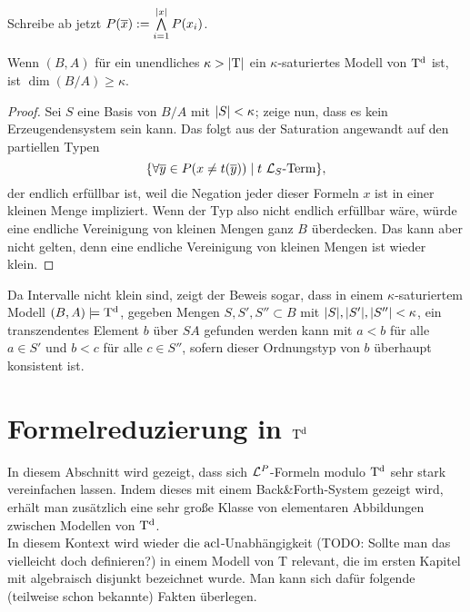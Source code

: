 \begin{definition}
	Schreibe ab jetzt $P(\overline{x}):=\bigwedge\limits_{i=1}^{\left| x \right|}P(x_i)$.
\end{definition}

\newpage

\begin{lemma}
	Wenn $(B,A)$ für ein unendliches $\kappa>{\left| \operatorname{T} \right|}$ ein $\kappa$-saturiertes Modell von $\operatorname{T^d}$ ist, ist $\dim(B/A)\geq\kappa$.
\end{lemma}
\begin{proof}
	Sei $S$ eine Basis von $B/A$ mit ${\left| S \right|}<\kappa$; zeige nun, dass es kein Erzeugendensystem sein kann. Das folgt aus der Saturation angewandt auf den partiellen Typen $$\{\forall\overline{y}\in P(x\neq t(\overline{y}))\mid t\ \mathcal{L}_S\text{-Term}\},$$ der endlich erfüllbar ist, weil die Negation jeder dieser Formeln \glqq{}$x$ ist in einer kleinen Menge\grqq{} impliziert. Wenn der Typ also nicht endlich erfüllbar wäre, würde eine endliche Vereinigung von kleinen Mengen ganz $B$ überdecken. Das kann aber nicht gelten, denn eine endliche Vereinigung von kleinen Mengen ist wieder klein.
\end{proof}

\begin{corollary}\label{Finden transz Elte}
	Da Intervalle nicht klein sind, zeigt der Beweis sogar, dass in einem $\kappa$-saturiertem Modell $(B,A)\models\operatorname{T^d}$, gegeben Mengen $S,S',S''\subset B$ mit ${\left| S \right|},{\left| S' \right|},{\left| S'' \right|}<\kappa$, ein transzendentes Element $b$ über $SA$ gefunden werden kann mit $a<b$ für alle $a\in S'$ und $b<c$ für alle $c\in S''$, sofern dieser Ordnungstyp von $b$ überhaupt konsistent ist.
\end{corollary}

\newpage

\section{Formelreduzierung in $\operatorname{T^d}$}
In diesem Abschnitt wird gezeigt, dass sich $\mathcal{L}^P$-Formeln modulo $\operatorname{T^d}$ sehr stark vereinfachen lassen. Indem dieses mit einem Back\&Forth-System gezeigt wird, erhält man zusätzlich eine sehr große Klasse von elementaren Abbildungen zwischen Modellen von $\operatorname{T^d}$.\\
In diesem Kontext wird wieder die $\operatorname{acl}$-Unabhängigkeit (TODO: Sollte man das vielleicht doch definieren?) in einem Modell von T relevant, die im ersten Kapitel mit \glqq{}algebraisch disjunkt\grqq{} bezeichnet wurde. Man kann sich dafür folgende (teilweise schon bekannte) Fakten überlegen.

